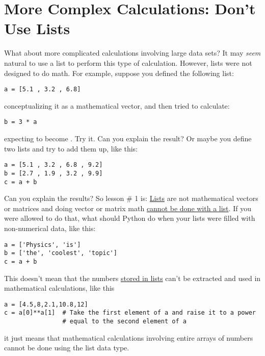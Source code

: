 \section{More Complex Calculations: Don't Use Lists}
What about more complicated calculations involving large data sets?
It may {\em seem} natural to use a list to perform this type of calculation.
However, lists were not designed to do math. For example,
suppose you defined the following list:
\begin{Verbatim}
a = [5.1 , 3.2 , 6.8]
\end{Verbatim}
conceptualizing it as a mathematical vector, and then tried to calculate:
\begin{Verbatim}
b = 3 * a
\end{Verbatim}
expecting  to become \code{[15.3,9.6,20.4]}.  Try it.  Can you
explain the result? Or maybe you define two lists and try to add them
up, like this:
\begin{Verbatim}
a = [5.1 , 3.2 , 6.8 , 9.2]
b = [2.7 , 1.9 , 3.2 , 9.9]
c = a + b
\end{Verbatim}
Can you explain the results?  So lesson \# 1 is: \ul{Lists} are not
mathematical vectors or matrices and doing vector or matrix math
\underline{cannot be done with a list}.  If you were allowed to do
that, what should Python do when your lists were filled with
non-numerical data, like this:
\begin{Verbatim}
a = ['Physics', 'is']
b = ['the', 'coolest', 'topic']
c = a + b
\end{Verbatim}
  This doesn't mean that the numbers \ul{stored in
  lists} can't be extracted and used in mathematical calculations,
like this
\begin{Verbatim}
a = [4.5,8,2.1,10.8,12]
c = a[0]**a[1]  # Take the first element of a and raise it to a power
                # equal to the second element of a
\end{Verbatim}
it just means that mathematical calculations involving entire arrays
of numbers cannot be done using the list data type.

